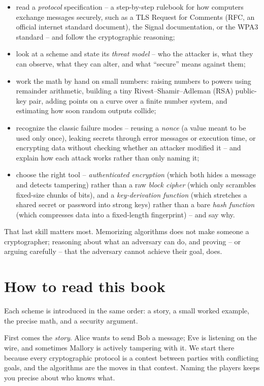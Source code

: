 \begin{itemize}
  \item read a \emph{protocol} specification -- a step-by-step rulebook for how computers exchange messages securely, such as a TLS Request for Comments (RFC, an official internet standard document), the Signal documentation, or the WPA3 standard -- and follow the cryptographic reasoning;
  \item look at a scheme and state its \emph{threat model} -- who the attacker is, what they can observe, what they can alter, and what ``secure'' means against them;
  \item work the math by hand on small numbers: raising numbers to powers using remainder arithmetic, building a tiny Rivest--Shamir--Adleman (RSA) public-key pair, adding points on a curve over a finite number system, and estimating how soon random outputs collide;
  \item recognize the classic failure modes -- reusing a \emph{nonce} (a value meant to be used only once), leaking secrets through error messages or execution time, or encrypting data without checking whether an attacker modified it -- and explain how each attack works rather than only naming it;
  \item choose the right tool -- \emph{authenticated encryption} (which both hides a message and detects tampering) rather than a raw \emph{block cipher} (which only scrambles fixed-size chunks of bits), and a \emph{key-derivation function} (which stretches a shared secret or password into strong keys) rather than a bare \emph{hash function} (which compresses data into a fixed-length fingerprint) -- and say why.
\end{itemize}

That last skill matters most. Memorizing algorithms does not make someone a cryptographer; reasoning about what an adversary can do, and proving -- or arguing carefully -- that the adversary cannot achieve their goal, does.

\section*{How to read this book}

Each scheme is introduced in the same order: a story, a small worked example, the precise math, and a security argument.

First comes the \emph{story}. Alice wants to send Bob a message; Eve is listening on the wire, and sometimes Mallory is actively tampering with it. We start there because every cryptographic protocol is a contest between parties with conflicting goals, and the algorithms are the moves in that contest. Naming the players keeps you precise about who knows what.

